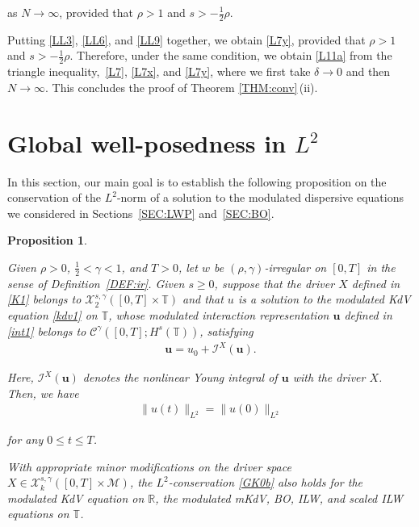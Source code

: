 \documentclass[letterpaper, 11pt,  reqno]{amsart}
\newtheorem{proposition}[theorem]{Proposition}
\newcommand{\1}{\hspace{0.5mm}\text{I}\hspace{0.5mm}}
\newcommand{\I}{\mathcal{I}}
\newcommand{\noi}{\noindent}
\newcommand{\R}{\mathbb{R}}
\newcommand{\T}{\mathbb{T}}
\newcommand{\CC}{\mathcal{C}}
\newcommand{\dl}{\delta}
\newcommand{\g}{\gamma}
\newcommand{\M}{\mathcal{M}}
\newcommand{\cX}{\mathcal{X}}
\newcommand{\uu}{\mathbf{u}}
\numberwithin{equation}{section}
\numberwithin{theorem}{section}
\begin{document}
\noi
as $N \to \infty$, 
provided that $\rho > 1$ and $s > -\frac12\rho$.


\medskip

Putting 
\eqref{LL3}, 
\eqref{LL6},  and 
\eqref{LL9} together, 
we obtain \eqref{L7y}, 
provided that 
 $\rho > 1$ and $s > -\frac 12\rho$.
Therefore, under the same condition, 
we obtain
\eqref{L11a}
from the triangle inequality,~\eqref{L7}, \eqref{L7x}, and \eqref{L7y}, 
where we first take $\dl \to 0$ and then $N \to \infty$.
This  concludes the proof of Theorem \ref{THM:conv}\,(ii).




\section{Global well-posedness in 
$L^2$}
\label{SEC:GWP1}

In this section, 
our main goal is to  establish the following proposition on the conservation of the $L^2$-norm
of a solution to the modulated dispersive equations
we considered in Sections~\ref{SEC:LWP} and~\ref{SEC:BO}.




\begin{proposition}
\label{PROP:L2}

Given $\rho > 0$,  $\frac 12 < \g < 1$, and $T> 0$, 
let  $w$ be $(\rho,\g)$-irregular on $[0, T]$ in the sense of Definition~\ref{DEF:ir}.
Given $s \ge 0$, suppose that 
the driver $X$  defined in 
\eqref{K1} belongs to 
   $ \cX^{s, \g}_2([0, T]\times \T)$
   and that 
$u $ is a solution to the modulated KdV equation \eqref{kdv1} on $\T$,  whose
modulated interaction representation $\uu$ defined in \eqref{int1}
belongs to  $\CC^\g([0, T];H^s(\T)) $, 
satisfying 
\begin{align}
\uu  = u_0 + \I^X(\uu).
\label{GK0a}
\end{align}


\noi
Here,  $\I^X(\uu)$ denotes the nonlinear Young integral of $\uu$
with the driver $X$.
Then, we have
\begin{align}
\| u(t) \|_{L^2} = \| u(0) \|_{L^2}
\label{GK0b}
\end{align}

\noi
for any $0 \le t \le T$.

With appropriate minor modifications
on the driver space 
   $X \in \cX^{s, \g}_k([0, T]\times \M)$, 
the  $L^2$-conservation \eqref{GK0b} also  holds
for the modulated KdV equation on $\R$, 
the modulated mKdV, BO, ILW, and scaled ILW equations on $\T$.


 
\end{proposition}
\end{document}
